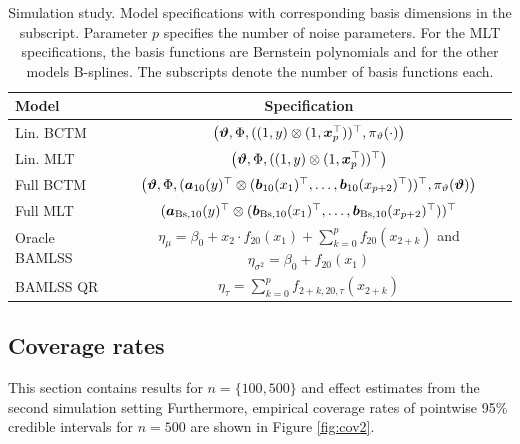 \documentclass[12pt, a4paper]{article}
\begin{document}
\begin{table}[H]
    \centering
    \begin{tabular}{l|c}
    \hline\hline
         Model & Specification\\
         \hline 
        Lin. BCTM & $\big( \text{\boldmath$\vartheta$}, \Phi,((1,y) \otimes (1,\text{\boldmath$x$}_p^\top))^\top,\allowbreak \pi_\vartheta(\cdot)\big)$\\
       Lin. MLT & $\big( \text{\boldmath$\vartheta$}, \Phi,((1,y) \otimes (1,\text{\boldmath$x$}_p^\top))^\top \big)$\\
        Full BCTM &  $\big(\text{\boldmath$\vartheta$},\Phi,(\text{\boldmath$a$}_{10}(y)^\top \otimes ( \text{\boldmath$b$}_{10}(x_1)^\top, \ldots,\allowbreak \text{\boldmath$b$}_{10}(x_{p+2})^\top))^\top, \pi_\vartheta(\text{\boldmath$\vartheta$})\big)$\\
        Full MLT & $(\text{\boldmath$a$}_{\text{Bs},10}(y)^\top \otimes ( \text{\boldmath$b$}_{\text{Bs},10}(x_1)^\top, \ldots, \text{\boldmath$b$}_{\text{Bs},10}(x_{p+2})^\top))^\top$ \\
       Oracle BAMLSS &  $\eta_{\mu} = \beta_0 + x_2 \cdot f_{20}(x_1) + \sum_{k=0}^p f_{20}(x_{2+k})$ and $\eta_{\sigma^2}= \beta_0 + f_{20}(x_1)$  \\
        BAMLSS QR & $\eta_\tau = \sum_{k=0}^{p} f_{2+k,20,\tau}(x_{2+k})$\\
        \hline\hline
    \end{tabular}
    \caption{Simulation study. Model specifications with corresponding basis dimensions in the subscript. Parameter $p$ specifies the number of noise parameters. For the MLT specifications, the basis functions are Bernstein polynomials and for the other models B-splines. The subscripts denote the number of basis functions each.}
    \label{tab:sim:models}
\end{table}

\subsection{Coverage rates}
This section contains results for $n=\{100, 500\}$ and effect estimates from the second simulation setting
Furthermore, empirical coverage rates of pointwise 95\% credible intervals for $n=500$ are shown in Figure \ref{fig:cov2}.


\end{document}
